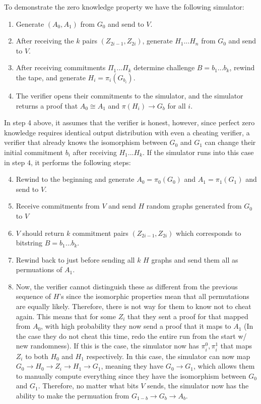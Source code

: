 \documentclass[11pt]{article}
\begin{document}
To demonstrate the zero knowledge property we have the following simulator:
\begin{enumerate}
    \item Generate $(A_0,A_1)$ from $G_0$ and send to $V$.
    \item After receiving the $k$ pairs $(Z_{2i-1},Z_{2i})$, generate $H_1...H_n$ from $G_0$ and send to $V$.
    \item After receiving commitments $\Pi_1...\Pi_k$ determine challenge $B=b_1...b_k$, rewind the tape, and generate $H_i = \pi_i(G_{b_i})$.
    \item The verifier opens their commitments to the simulator, and the simulator returns a proof that $A_0 \cong A_1$ and $\pi(H_i) \rightarrow G_b$ for all $i$.
\end{enumerate}
In step 4 above, it assumes that the verifier is honest, however, since perfect zero knowledge requires identical output distribution with even a cheating verifier, a verifier that already knows the isomorphism between $G_0$ and $G_1$ can change their initial commitment $b_i$ after receiving $H_1...H_k$. If the simulator runs into this case in step $4$, it performs the following steps:
\begin{enumerate}
    \setcounter{enumi}{3}
    \item Rewind to the beginning and generate $A_0 = \pi_0(G_0)$ and $A_1 = \pi_1(G_1)$ and send to $V$.
    \item Receive commitments from $V$ and send $H$ random graphs generated from $G_0$ to $V$
    \item $V$ should return $k$ commitment pairs $(Z_{2i-1},Z_{2i})$ which corresponds to bitstring $B = b_1...b_k$.
    \item Rewind back to just before sending all $k$ $H$ graphs and send them all as permuations of $A_1$.
    \item Now, the verifier cannot distinguish these as different from the previous sequence of $H$'s since the isomorphic properties mean that all permutations are equally likely. Therefore, there is not way for them to know not to cheat again. This means that for some $Z_i$ that they sent a proof for that mapped from $A_0$, with high probability they now send a proof that it maps to $A_1$ (In the case they do not cheat this time, redo the entire run from the start w/ new randomness). If this is the case, the simulator now has $\pi^0_{i}, \pi^1_{i}$ that maps $Z_i$ to both $H_0$ and $H_1$ respectively. In this case, the simulator can now map $G_0 \rightarrow H_0 \rightarrow Z_i \rightarrow H_1 \rightarrow G_1$, meaning they have $G_0 \rightarrow G_1$, which allows them to manually compute everything since they have the isomorphism between $G_0$ and $G_1$. Therefore, no matter what bits $V$ sends, the simulator now has the ability to make the permuation from $G_{1-b} \rightarrow G_{b} \rightarrow A_b$.
\end{enumerate}
\end{document}
